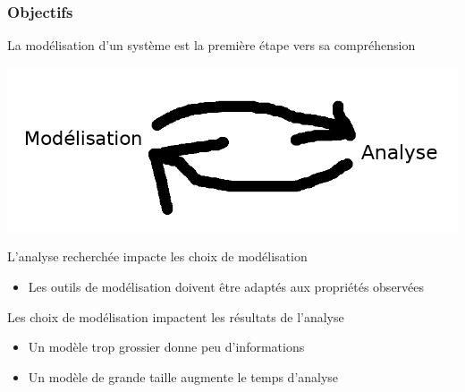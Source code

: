 
\begin{frame}[c]
  \frametitle{Objectifs}

La modélisation d'un système est la première étape vers sa compréhension

\begin{center}
  \includegraphics[width=.4\textwidth]{figs/modelanalyse.png}
\end{center}

L'analyse recherchée impacte les choix de modélisation
\begin{itemize}
  \item Les outils de modélisation doivent être adaptés aux propriétés observées
\end{itemize}

\medskip
Les choix de modélisation impactent les résultats de l'analyse
\begin{itemize}
  \item Un modèle trop grossier donne peu d'informations
  \item Un modèle de grande taille augmente le temps d'analyse
\end{itemize}

\medskip
\begin{center}
\end{center}

\end{frame}
